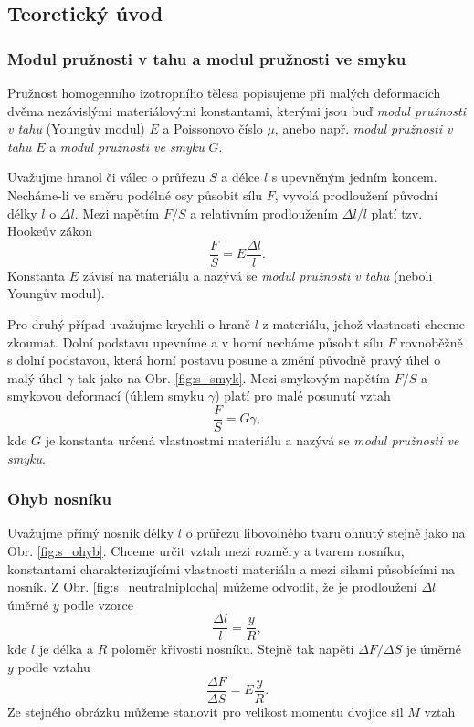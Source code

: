 \documentclass[english]{article}
\begin{document}
	\subsection{Teoretický úvod}
			
			\subsubsection{Modul pružnosti v tahu a modul pružnosti ve smyku}
					Pružnost homogenního izotropního tělesa popisujeme při malých deformacích dvěma nezávislými materiálovými konstantami, kterými jsou buď \textit{modul pružnosti v tahu} (Youngův modul) $E$ a Poissonovo číslo $\mu$, anebo např. 	\textit{modul pružnosti v tahu} $E$ a \textit{modul pružnosti ve smyku} $G$. 
					
					Uvažujme hranol či válec o průřezu $S$ a délce $l$ s upevněným jedním koncem. Necháme-li ve směru podélné osy působit sílu $F$, vyvolá prodloužení původní délky $l$ o $\Delta l$. Mezi napětím $F/S$ a relativním prodloužením $\Delta l/l$ platí tzv. Hookeův zákon
							\begin{equation} \label{eq:younguv_modul}
							\frac{F}{S} = E \frac{\Delta l }{l}.
							\end{equation}
					Konstanta $E$ závisí na materiálu a nazývá se \textit{modul pružnosti v tahu} (neboli Youngův modul).
					
					Pro druhý případ uvažujme krychli o hraně $l$ z materiálu, jehož vlastnosti chceme zkoumat. Dolní podstavu upevníme a v horní necháme působit sílu $F$ rovnoběžně s dolní podstavou, která horní postavu posune a změní původně pravý úhel o malý úhel $\gamma$ tak jako na Obr. \ref{fig:s_smyk}. Mezi smykovým napětím $F/S$ a smykovou deformací (úhlem smyku $\gamma$) platí pro malé posunutí vztah
							\begin{equation}
							\frac{F}{S} = G \gamma,
							\end{equation}
					kde $G$ je konstanta určená vlastnostmi materiálu a nazývá se \textit{modul pružnosti ve smyku}.
			
			\subsubsection{Ohyb nosníku}
					Uvažujme přímý nosník délky $l$ o průřezu libovolného tvaru ohnutý stejně jako na Obr. \ref{fig:s_ohyb}. Chceme určit vztah mezi rozměry a tvarem nosníku, konstantami charakterizujícími vlastnosti materiálu a mezi silami působícími na nosník. Z Obr. \ref{fig:s_neutralniplocha} můžeme odvodit, že je prodloužení $\Delta l$ úměrné $y$ podle vzorce 
								\begin{equation}
								\frac{\Delta l}{l} = \frac{y}{R},
								\end{equation}
					kde $l$ je délka a $R$ poloměr křivosti nosníku. Stejně tak napětí $\Delta F/\Delta S$ je úměrné $y$ podle vztahu
								\begin{equation} \label{eq:sila_na_plochu_pricny_prurez}
								\frac{\Delta F}{\Delta S} = E \frac{y}{R}.
								\end{equation}	
					Ze stejného obrázku můžeme stanovit pro velikost momentu dvojice sil $M$ vztah
					
\end{document}
